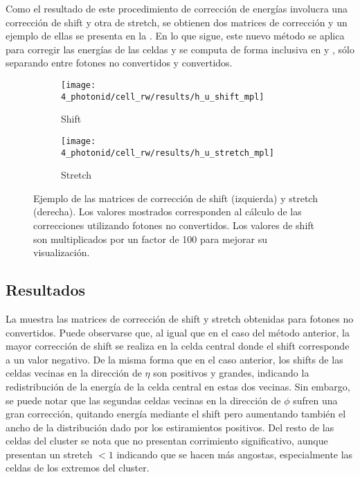 Como el resultado de este procedimiento de corrección de energías involucra una corrección de shift y otra de stretch, se obtienen dos matrices de corrección y un ejemplo de ellas se presenta en la \Fig{\ref{fig:ss_corrections:cell_rw:calculation:new:reweights}}.
En lo que sigue, este nuevo método se aplica para corregir las energías de las celdas y se computa de forma inclusiva en \pt y \abseta, sólo separando entre fotones no convertidos y convertidos.

\begin{figure}[ht!]
    \centering
    \begin{subfigure}[h]{0.49\linewidth}
        \centering
        \texttt{[image: 4\_photonid/cell\_rw/results/h\_u\_shift\_mpl]}
        \caption{Shift}
    \end{subfigure}
    \hfill
    \begin{subfigure}[h]{0.49\linewidth}
        \centering
        \texttt{[image: 4\_photonid/cell\_rw/results/h\_u\_stretch\_mpl]}
        \caption{Stretch}
    \end{subfigure}
    \caption{Ejemplo de las matrices de corrección de shift (izquierda) y stretch (derecha). Los valores mostrados corresponden al cálculo de las correcciones utilizando fotones no convertidos. Los valores de shift son multiplicados por un factor de 100 para mejorar su visualización.}
    \label{fig:ss_corrections:cell_rw:calculation:new:reweights}
\end{figure}









\subsection{Resultados}
\label{subsec:ss_corrections:cell_rw:results}

La \Fig{\ref{fig:ss_corrections:cell_rw:calculation:new:reweights}} muestra las matrices de corrección de shift y stretch obtenidas para fotones no convertidos. Puede observarse que, al igual que en el caso del método anterior, la mayor corrección de shift se realiza en la celda central donde el shift corresponde a un valor negativo. De la misma forma que en el caso anterior, los shifts de las celdas vecinas en la dirección de \(\eta\) son positivos y grandes, indicando la redistribución de la energía de la celda central en estas dos vecinas.
Sin embargo, se puede notar que las segundas celdas vecinas en la dirección de \(\phi\) sufren una gran corrección, quitando energía mediante el shift pero aumentando también el ancho de la distribución dado por los estiramientos positivos. Del resto de las celdas del cluster se nota que no presentan corrimiento significativo, aunque presentan un stretch \(<1\) indicando que se hacen más angostas, especialmente las celdas de los extremos del cluster.

